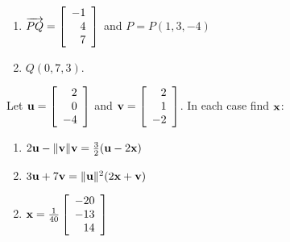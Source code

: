 \begin{multicols}{2}
\begin{ex}
\begin{enumerate}[label={\alph*.}]
\item
$\overrightarrow{PQ} = \left[
\begin{array}{r}
-1\\
4\\
7
\end{array}
\right]$
and
$P = P(1,3,-4)
$


\end{enumerate}
\begin{sol}
\begin{enumerate}[label={\alph*.}]
\setcounter{enumi}{1}
\item  $Q(0, 7, 3)$.

\end{enumerate}
\end{sol}
\end{ex}

\columnbreak
\begin{ex}
Let 
$\textbf{u} = \left[
\begin{array}{r}
2\\
0\\
-4
\end{array}
\right]$
and 
$\textbf{v} = \left[
\begin{array}{r}
2\\
1\\
-2
\end{array}
\right]$. In each case find $\textbf{x}$:


\begin{enumerate}[label={\alph*.}]
\item $2\textbf{u} - \| \textbf{v} \| \textbf{v} = \tfrac{3}{2}(\textbf{u} - 2\textbf{x})$

\item $3\textbf{u} + 7\textbf{v} = \|\textbf{u}\|^{2}(2\textbf{x} + \textbf{v})$

\end{enumerate}
\begin{sol}
\begin{enumerate}[label={\alph*.}]
\setcounter{enumi}{1}
\item
$\textbf{x} = \tfrac{1}{40}\left[
\begin{array}{r}
-20\\
-13\\
14
\end{array}
\right]$

\end{enumerate}
\end{sol}
\end{ex}


\end{multicols}
